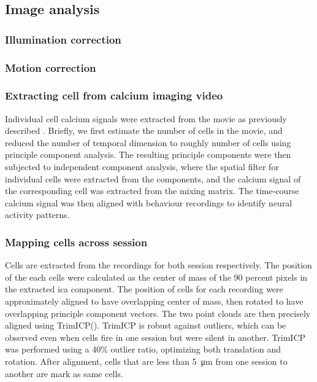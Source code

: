 \subsection{Image analysis}
\subsubsection{Illumination correction}
\subsubsection{Motion correction}

\subsubsection{Extracting cell from calcium imaging video}
Individual cell calcium signals were extracted from the movie as previously described \citep{mukamel09}. Briefly, we first estimate the number of cells in the movie, and reduced the number of temporal dimension to roughly number of cells using principle component analysis. The resulting principle components were then subjected to independent component analysis, where the spatial filter for individual cells were extracted from the components, and the calcium signal of the corresponding cell was extracted from the mixing matrix. The time-course calcium signal was then aligned with behaviour recordings to identify neural activity patterns.

\subsubsection{Mapping cells across session}
Cells are extracted from the recordings for both session respectively. The position of the each cells were calculated as the center of mass of the 90 percent pixels in the extracted \gls{ica} component. The position of cells for each recording were approximately aligned to have overlapping center of mass, then rotated to have overlapping principle component vectors. The two point clouds are then precisely aligned using TrimICP(). TrimICP is robust against outliers, which can be observed even when cells fire in one session but were silent in another. TrimICP was performed using a 40\% outlier ratio, optimizing both translation and rotation. After alignment, cells that are less than \SI{5}{\um} from one session to another are mark as  same cells.


